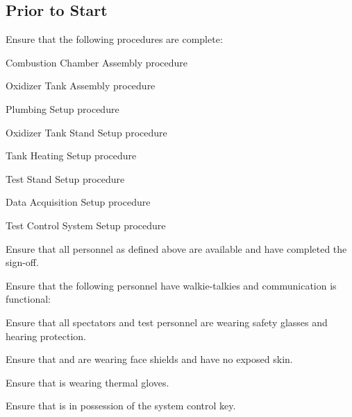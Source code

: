 \newpage
\subsection{Prior to Start}
\begin{checklist}
    \item Ensure that the following procedures are complete:
    \begin{checklist}
        \item Combustion Chamber Assembly procedure
        \item Oxidizer Tank Assembly procedure
        \item Plumbing Setup procedure
        \item Oxidizer Tank Stand Setup procedure
        \item Tank Heating Setup procedure
        \item Test Stand Setup procedure
        \item Data Acquisition Setup procedure
        \item Test Control System Setup procedure
    \end{checklist}
    \item Ensure that all personnel as defined above are available and have completed the sign-off.
    \item Ensure that the following personnel have walkie-talkies and communication is functional:
    \begin{checklist}
        \item \ops{}
        \item \primary{}
        \item \secondary{}
        \item \daq{}
        \item \heat
        \item \peri{}
        \item \perii{}
        \item \periii{}
    \end{checklist}
    \item Ensure that all spectators and test personnel are wearing safety glasses and hearing protection.
    \item Ensure that \primary{} and \secondary{} are wearing face shields and have no exposed skin.
    \item Ensure that \primary{} is wearing thermal gloves.
    \item Ensure that \secondary{} is in possession of the system control key.
\end{checklist}
\setcounter{checklistnum}{0}

